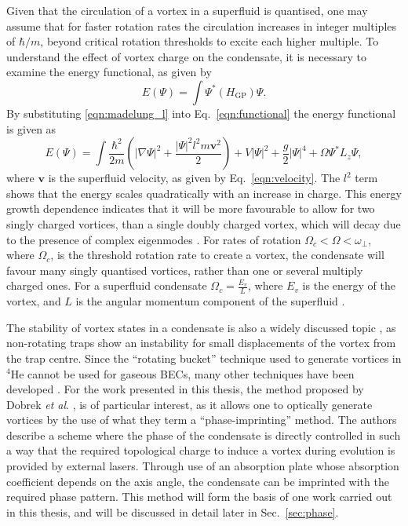Given that the circulation of a vortex in a superfluid is quantised, one may assume that for faster rotation rates the circulation increases in integer multiples of $\hbar/m$, beyond critical rotation thresholds to excite each higher multiple. To understand the effect of vortex charge on the condensate, it is necessary to examine the energy functional, as given by
    \begin{equation}\label{eqn:functional}
        E(\Psi) = \int \Psi^{*} (H_{\text{GP}}) \Psi.
    \end{equation}
By substituting \eqref{eqn:madelung_l} into Eq.~\eqref{eqn:functional} the energy functional is given as
\begin{equation}\label{eqn:functional_full}
    E(\Psi) = \int \frac{\hbar^2}{2m} \left(|\nabla\Psi|^2  + \frac{|\Psi|^2 l^2 m \mathbf{v}^2}{2}  \right) + V|\Psi|^2 + \frac{g}{2}|\Psi|^4 + \Omega \Psi^{*} L_z \Psi,
\end{equation}
where $\mathbf{v}$ is the superfluid velocity, as given by Eq.~\eqref{eqn:velocity}. The $l^2$ term shows that the energy scales quadratically with an increase in charge. This energy growth dependence indicates that it will be more favourable to allow for two singly charged vortices, than a single doubly charged vortex, which will decay due to the presence of complex eigenmodes \cite{VTX:Kawaguchi_pra_2004}. For rates of rotation $\Omega_c < \Omega < \omega_\perp$, where $\Omega_c$, is the threshold rotation rate to create a vortex, the condensate will favour many singly quantised vortices, rather than one or several multiply charged ones. For a superfluid condensate $\Omega_c = \frac{E_v}{L}$, where $E_v$ is the energy of the vortex, and $L$ is the angular momentum component of the superfluid \cite{BK:Pitaevskii_Stringari_2003}.

The stability of vortex states in a condensate is also a widely discussed topic \cite{Vtx:Fedichev_pra_1999,Vtx:Feder_prl_1999}, as non-rotating traps show an instability for small displacements of the vortex from the trap centre. Since the ``rotating bucket'' technique used to generate vortices in $^4$He cannot be used for gaseous BECs, many other techniques have been developed \cite{Vtx:Anglin_prl_1999,Vtx:Davies_prl_1999,Vtx:Marshall_pra_1999,Vtx:Dobrek_pra_1999,VTX:Nakahara_physb_2000}. For the work presented in this thesis, the method proposed by Dobrek \textit{et al}. \cite{Vtx:Dobrek_pra_1999}, is of particular interest, as it allows one to optically generate vortices by the use of what they term a ``phase-imprinting'' method. The authors describe a scheme where the phase of the condensate is directly controlled in such a way that the required topological charge to induce a vortex during evolution is provided by external lasers. Through use of an absorption plate whose absorption coefficient depends on the axis angle, the condensate can be imprinted with the required phase pattern. This method will form the basis of one work carried out in this thesis, and will be discussed in detail later in Sec.~\ref{sec:phase}.


